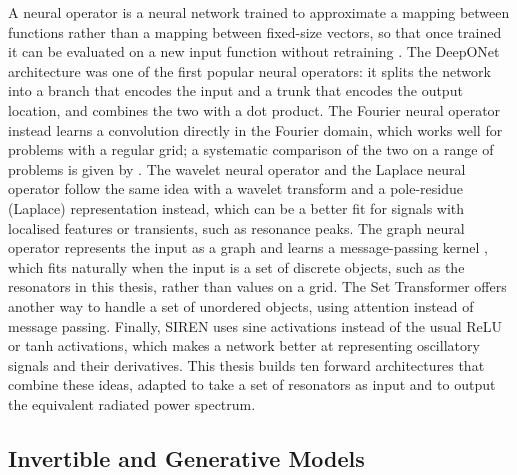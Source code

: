 A neural operator is a neural network trained to approximate a mapping between functions rather than a mapping between fixed-size vectors, so that once trained it can be evaluated on a new input function without retraining \parencite{kovachki2023neural}. The DeepONet architecture \parencite{lu2021deeponet} was one of the first popular neural operators: it splits the network into a branch that encodes the input and a trunk that encodes the output location, and combines the two with a dot product. The Fourier neural operator \parencite{li2021fno} instead learns a convolution directly in the Fourier domain, which works well for problems with a regular grid; a systematic comparison of the two on a range of problems is given by \textcite{lu2022comparison}. The wavelet neural operator \parencite{tripura2022wno} and the Laplace neural operator \parencite{cao2023lno} follow the same idea with a wavelet transform and a pole-residue (Laplace) representation instead, which can be a better fit for signals with localised features or transients, such as resonance peaks. The graph neural operator \parencite{li2020graphno} represents the input as a graph and learns a message-passing kernel \parencite{gilmer2017mpnn}, which fits naturally when the input is a set of discrete objects, such as the resonators in this thesis, rather than values on a grid. The Set Transformer \parencite{lee2019settransformer} offers another way to handle a set of unordered objects, using attention \parencite{vaswani2017attention} instead of message passing. Finally, SIREN \parencite{sitzmann2020siren} uses sine activations instead of the usual ReLU or tanh activations, which makes a network better at representing oscillatory signals and their derivatives. This thesis builds ten forward architectures that combine these ideas, adapted to take a set of resonators as input and to output the equivalent radiated power spectrum.

\subsection{Invertible and Generative Models}

